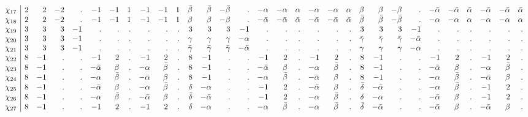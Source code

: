 \documentclass[11pt,reqno]{amsart}
\theoremstyle{definition}
\numberwithin{equation}{section}
\begin{document}
$$\begin{array}{l | rrrrrrrrrrrrrrrrrrrrrrrrrrrrrr}
\chi_{17} &    2&  2& -2&  .&  -1&  -1&  1&  -1&  -1&  1& \bar\beta&  \bar\beta& -\bar\beta&   .&  -\alpha&  -\alpha&  \alpha&  -\alpha&  -\alpha&  \alpha&  \beta&   \beta&  -\beta&   .& -\bar\alpha& -\bar\alpha& \bar\alpha& -\bar\alpha& -\bar\alpha& \bar\alpha\\
\chi_{18}&     2&  2& -2&  .&  -1&  -1&  1&  -1&  -1&  1&  \beta&   \beta&  -\beta&   .& -\bar\alpha& -\bar\alpha& \bar\alpha& -\bar\alpha& -\bar\alpha& \bar\alpha& \bar\beta&  \bar\beta& -\bar\beta&   .&  -\alpha&  -\alpha&  \alpha&  -\alpha&  -\alpha&  \alpha\\
\chi_{19} &    3&  3&  3& -1&   .&   .&  .&   .&   .&  .&  3&   3&   3&  -1&   .&   .&  .&   .&   .&  .&  3&   3&   3&  -1&   .&   .&  .&   .&   .&  .\\
\chi_{20} &    3&  3&  3& -1&   .&   .&  .&   .&   .&  .&  \gamma&   \gamma&   \gamma&  -\alpha&   .&   .&  .&   .&   .&  .& \bar\gamma&  \bar\gamma&  \bar\gamma& -\bar\alpha&   .&   .&  .&   .&   .&  .\\
\chi_{21}&     3&  3&  3& -1&   .&   .&  .&   .&   .&  .& \bar\gamma&  \bar\gamma&  \bar\gamma& -\bar\alpha&   .&   .&  .&   .&   .&  .&  \gamma&   \gamma&   \gamma&  -\alpha&   .&   .&  .&   .&   .&  .\\
\chi_{22}&     8& -1&  .&  .&  -1&   2&  .&  -1&   2&  .&  8&  -1&   .&   .&  -1&   2&  .&  -1&   2&  .&  8&  -1&   .&   .&  -1&   2&  .&  -1&   2&  .\\
\chi_{23}&     8& -1&  .&  .& -\bar\alpha&   \beta&  .&  -\alpha&  \bar\beta&  .&  8&  -1&   .&   .& -\bar\alpha&   \beta&  .&  -\alpha&  \bar\beta&  .&  8&  -1&   .&   .& -\bar\alpha&   \beta&  .&  -\alpha&  \bar\beta&  .\\
\chi_{24} &    8& -1&  .&  .&  -\alpha&  \bar\beta&  .& -\bar\alpha&   \beta&  .&  8&  -1&   .&   .&  -\alpha&  \bar\beta&  .& -\bar\alpha&   \beta&  .&  8&  -1&   .&   .&  -\alpha&  \bar\beta&  .& -\bar\alpha&   \beta&  .\\
\chi_{25} &    8& -1&  .&  .& -\bar\alpha&   \beta&  .&  -\alpha&  \bar\beta&  .&  \delta&  -\alpha&   .&   .&  -1&   2&  .& -\bar\alpha&   \beta&  .& \bar\delta& -\bar\alpha&   .&   .&  -\alpha&  \bar\beta&  .&  -1&   2&  .\\
\chi_{26} &    8& -1&  .&  .&  -\alpha&  \bar\beta&  .& -\bar\alpha&   \beta&  .& \bar\delta& -\bar\alpha&   .&   .&  -1&   2&  .&  -\alpha&  \bar\beta&  .&  \delta&  -\alpha&   .&   .& -\bar\alpha&   \beta&  .&  -1&   2&  .\\
\chi_{27} &    8& -1&  .&  .&  -1&   2&  .&  -1&   2&  .&  \delta&  -\alpha&   .&   .&  -\alpha&  \bar\beta&  .&  -\alpha&  \bar\beta&  .& \bar\delta& -\bar\alpha&   .&   .& -\bar\alpha&   \beta&  .& -\bar\alpha&   \beta&  .\\

\end{array}$$
\end{document}
